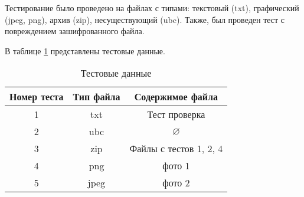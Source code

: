 Тестирование было проведено на файлах с типами: текстовый (txt), графический (jpeg, png), архив (zip), несуществующий (ubc). Также, был проведен тест с повреждением зашифрованного файла.

В таблице \ref{tbl:test} представлены тестовые данные.

\begin{table}[H]
	\begin{center}
		\centering
		\caption{Тестовые данные}
		\label{tbl:test}
		\begin{tabular}{|c|c|c|} 
			
			\hline
			\multicolumn{1}{|c|}{Номер теста}
			&  \multicolumn{1}{c|}{Тип файла} &  \multicolumn{1}{c|}{Содержимое файла}\\
			\hline
			
			1& txt &  {Тест проверка} \\ \hline
			
			2& ubc &  $\varnothing$\\ \hline
			
			3& zip & Файлы с тестов 1, 2, 4 \\ \hline
			
			4& png & фото 1 \\ \hline
			
			5& jpeg & фото 2 \\ \hline
			
			
		\end{tabular}
	\end{center}
\end{table}
